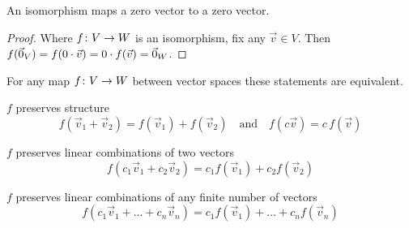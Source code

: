 
\begin{lemma}       \label{le:IsoSendsZeroToZero}
An isomorphism maps a zero vector to a zero vector.
\end{lemma}

\begin{proof}
Where \( \mbox{$f\colon V\to W$} \) is an isomorphism, fix any \( \vec{v}\in V \).
Then \( f(\vec{0}_V)=f(0\cdot\vec{v})=0\cdot f(\vec{v})=\vec{0}_W \). 
\end{proof}


\begin{lemma}       \label{le:PresStructIffPresCombos}
For any map \( \mbox{$f\colon V\to W$} \) between vector spaces
these statements are equivalent.
\begin{tfae}
   \item \( f \) preserves structure
     \begin{equation*}
        f(\vec{v}_1+\vec{v}_2)=f(\vec{v}_1)+f(\vec{v}_2)
         \quad\text{and}\quad
        f(c\vec{v})=c\,f(\vec{v})
     \end{equation*}
   \item \( f \) preserves linear combinations of two vectors
     \begin{equation*}
        f(c_1\vec{v}_1+c_2\vec{v}_2)=c_1f(\vec{v}_1)+c_2f(\vec{v}_2)
     \end{equation*}
   \item \( f \) preserves linear combinations of any finite number of 
     vectors
     \begin{equation*}
        f(c_1\vec{v}_1+\dots+c_n\vec{v}_n)=
           c_1f(\vec{v}_1)+\dots+c_nf(\vec{v}_n)
     \end{equation*}
\end{tfae}
\end{lemma}

